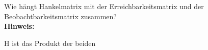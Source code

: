 \begin{question}[section=7,name={Beziehung der Hankelmatrix},difficulty=,type=mdl,tags={}]
	Wie hängt Hankelmatrix mit der Erreichbarkeitsmatrix und der Beobachtbarkeitsmatrix zusammen?
	\\ \textbf{Hinweis:}\\
	
\end{question}
\begin{solution}
	H ist das Produkt der beiden
\end{solution}